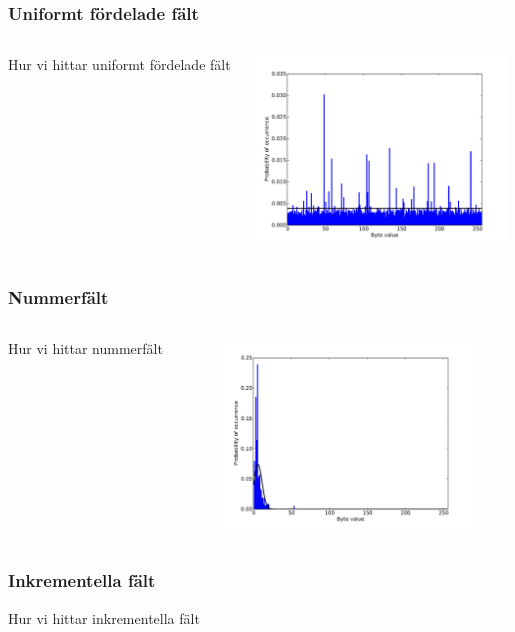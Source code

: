\documentclass[xetex]{beamer}
\begin{document}
    \begin{frame}
        \frametitle{Uniformt fördelade fält}
        \begin{columns}[t]
            \begin{column}[T]{6cm}
                Hur vi hittar uniformt fördelade fält
            \end{column}
            \begin{column}[T]{6cm}
                \includegraphics[height=5cm]{img/uniform.pdf}
            \end{column}
        \end{columns}
    \end{frame}
    \begin{frame}
        \frametitle{Nummerfält}
        \begin{columns}[t]
            \begin{column}[T]{6cm}
                Hur vi hittar nummerfält
            \end{column}
            \begin{column}[T]{6cm}
                \includegraphics[height=5cm]{img/number.pdf}
            \end{column}
        \end{columns}
    \end{frame}
    \begin{frame}
        \frametitle{Inkrementella fält}
        Hur vi hittar inkrementella fält
    \end{frame}
\end{document}
